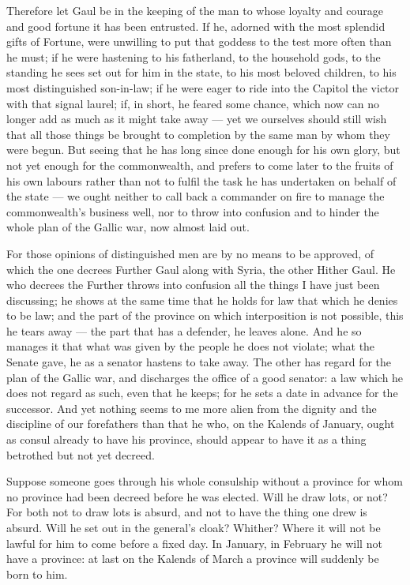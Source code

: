  Therefore let Gaul be in the keeping of the man to whose loyalty and courage and good fortune it has been entrusted. If he, adorned with the most splendid gifts of Fortune, were unwilling to put that goddess to the test more often than he must; if he were hastening to his fatherland, to the household gods, to the standing he sees set out for him in the state, to his most beloved children, to his most distinguished son-in-law; if he were eager to ride into the Capitol the victor with that signal laurel; if, in short, he feared some chance, which now can no longer add as much as it might take away --- yet we ourselves should still wish that all those things be brought to completion by the same man by whom they were begun. But seeing that he has long since done enough for his own glory, but not yet enough for the commonwealth, and prefers to come later to the fruits of his own labours rather than not to fulfil the task he has undertaken on behalf of the state --- we ought neither to call back a commander on fire to manage the commonwealth's business well, nor to throw into confusion and to hinder the whole plan of the Gallic war, now almost laid out.

 For those opinions of distinguished men are by no means to be approved, of which the one decrees Further Gaul along with Syria, the other Hither Gaul. He who decrees the Further throws into confusion all the things I have just been discussing; he shows at the same time that he holds for law that which he denies to be law; and the part of the province on which interposition is not possible, this he tears away --- the part that has a defender, he leaves alone. And he so manages it that what was given by the people he does not violate; what the Senate gave, he as a senator hastens to take away. The other has regard for the plan of the Gallic war, and discharges the office of a good senator: a law which he does not regard as such, even that he keeps; for he sets a date in advance for the successor. And yet nothing seems to me more alien from the dignity and the discipline of our forefathers than that he who, on the Kalends of January, ought as consul already to have his province, should appear to have it as a thing betrothed but not yet decreed.

 Suppose someone goes through his whole consulship without a province for whom no province had been decreed before he was elected. Will he draw lots, or not? For both not to draw lots is absurd, and not to have the thing one drew is absurd. Will he set out in the general's cloak? Whither? Where it will not be lawful for him to come before a fixed day. In January, in February he will not have a province: at last on the Kalends of March a province will suddenly be born to him.

